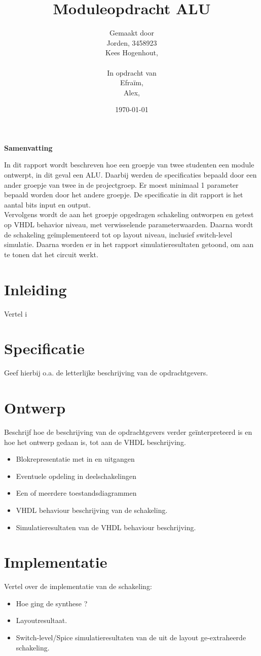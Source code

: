 \documentclass[11pt,twoside,a4paper]{article}
\title{Moduleopdracht ALU}
\author{
Gemaakt door\\
Jorden, 3458923\\
Kees Hogenhout, \\
\\
In opdracht van \\
Efraïm, \\
Alex, \\
}
\date{\today}
\begin{document}
\thispagestyle{empty}
\vspace{30 mm}

\begin{center}
\Large \bf 
Samenvatting
\end{center}
In dit rapport wordt beschreven hoe een groepje van twee studenten een module ontwerpt, in dit geval een ALU. Daarbij werden de specificaties bepaald door een ander groepje van twee in de projectgroep. Er moest minimaal 1 parameter bepaald worden door het andere groepje. De specificatie in dit rapport is het aantal bits input en output. \newline \\
Vervolgens  wordt de aan het groepje opgedragen schakeling ontworpen en getest op VHDL behavior niveau, met verwisselende parameterwaarden. Daarna wordt de schakeling geïmplementeerd tot op layout niveau, inclusief switch-level simulatie. 
Daarna worden er in het rapport simulatieresultaten getoond, om aan te tonen dat het circuit werkt. 
\clearpage

\tableofcontents
\clearpage

\section{Inleiding}
Vertel i

\section{Specificatie}
Geef hierbij o.a. de letterlijke beschrijving van de opdrachtgevers.

\section{Ontwerp}
Beschrijf hoe de beschrijving van de opdrachtgevers verder geïnterpreteerd is en hoe het ontwerp gedaan is, tot aan de VHDL beschrijving.
\begin{itemize}
\item
Blokrepresentatie met in en uitgangen
\item
Eventuele opdeling in deelschakelingen
\item
Een of meerdere toestandsdiagrammen 
\item
VHDL behaviour beschrijving van de schakeling.
\item
Simulatieresultaten van de VHDL behaviour beschrijving.
\end{itemize}

\section{Implementatie}
Vertel over de implementatie van de schakeling:
\begin{itemize}
\item
Hoe ging de synthese ?
\item
Layoutresultaat.
\item
Switch-level/Spice simulatieresultaten van de uit de layout ge-extraheerde schakeling.
\end{itemize}
\end{document}
